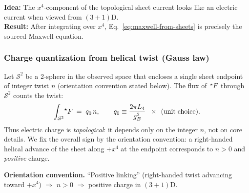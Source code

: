 \begin{tcolorbox}[title=Idea $\to$ Result]
\textbf{Idea:} The $x^4$-component of the topological sheet current looks like an electric current when viewed from $(3{+}1)$D.\\
\textbf{Result:} After integrating over $x^4$, Eq.~\eqref{eq:maxwell-from-sheets} is precisely the sourced Maxwell equation.
\end{tcolorbox}

\subsubsection{Charge quantization from helical twist (Gauss law)}
Let $\mathcal S^2$ be a 2-sphere in the observed space that encloses a single sheet endpoint of integer twist $n$ (orientation convention stated below). The flux of $\,{}^\star\!F\,$ through $\mathcal S^2$ counts the twist:
\begin{equation}
\int_{\mathcal S^2}\!{}^\star F\;=\; q_0\,n,\qquad q_0\equiv \frac{2\pi L_4}{g_B^{2}}\;\;\times\;\,(\text{unit\;choice}).
\label{eq:gauss-quantization}
\end{equation}
Thus electric charge is \emph{topological}: it depends only on the integer $n$, not on core details. We fix the overall sign by the orientation convention: a right-handed helical advance of the sheet along $+x^4$ at the endpoint corresponds to $n>0$ and \emph{positive} charge.

\begin{tcolorbox}
\textbf{Orientation convention.} ``Positive linking'' (right-handed twist advancing toward $+x^4$) $\Rightarrow$ $n>0$ $\Rightarrow$ positive charge in $(3{+}1)$D.
\end{tcolorbox}

